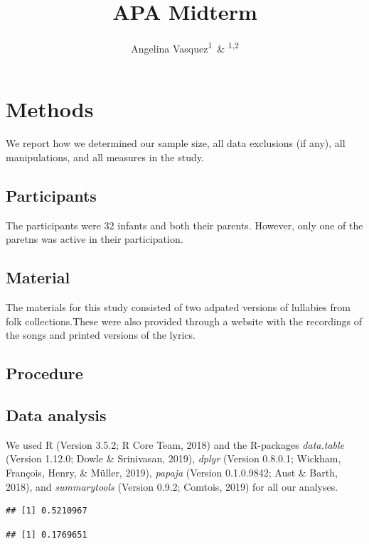 \documentclass[man]{apa6}
\title{APA Midterm}
\author{Angelina Vasquez\textsuperscript{1}~\& \textsuperscript{1,2}}
\date{}
\affiliation{
\vspace{0.5cm}
\textsuperscript{1} Brooklyn College\\\textsuperscript{2} }
\begin{document}
\maketitle

\section{Methods}\label{methods}

We report how we determined our sample size, all data exclusions (if
any), all manipulations, and all measures in the study.

\subsection{Participants}\label{participants}

The participants were 32 infants and both their parents. However, only
one of the paretns was active in their participation.

\subsection{Material}\label{material}

The materials for this study consisted of two adpated versions of
lullabies from folk collections.These were also provided through a
website with the recordings of the songs and printed versions of the
lyrics.

\subsection{Procedure}\label{procedure}

\subsection{Data analysis}\label{data-analysis}

We used R (Version 3.5.2; R Core Team, 2018) and the R-packages
\emph{data.table} (Version 1.12.0; Dowle \& Srinivasan, 2019),
\emph{dplyr} (Version 0.8.0.1; Wickham, François, Henry, \& Müller,
2019), \emph{papaja} (Version 0.1.0.9842; Aust \& Barth, 2018), and
\emph{summarytools} (Version 0.9.2; Comtois, 2019) for all our analyses.

\begin{verbatim}
## [1] 0.5210967
\end{verbatim}

\begin{verbatim}
## [1] 0.1769651
\end{verbatim}
\end{document}
